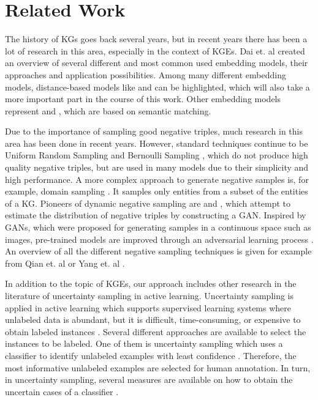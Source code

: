\section{Related Work} 
\label{sec:relatedwork}

The history of \acp{KG} goes back several years, but in recent years there has been a lot of research in this area, especially in the context of \acp{KGE}.  
Dai et. al \cite{electronics9050750} created an overview of several different and most common used embedding models, their approaches and application possibilities.
Among many different embedding models, distance-based models like \transe \cite{TransE} and \transd \cite{TransD} can be highlighted, which will also take a more important part in the course of this work.
Other embedding models represent \distmult \cite{DistMult} and \complex \cite{ComplEx}, which are based on semantic matching. 

Due to the importance of sampling good negative triples, much research in this area has been done in recent years.
However, standard techniques continue to be Uniform Random Sampling \cite{TransE} and Bernoulli Sampling \cite{TransH}, which do not produce high quality negative triples, but are used in many models due to their simplicity and high performance.  
A more complex approach to generate negative samples is, for example, domain sampling \cite{domainSampling}.
It samples only entities from a subset of the entities of a \ac{KG}.
Pioneers of dynamic negative sampling are \kbgan \cite{cai2017kbgan} and \igan \cite{IGAN}, which attempt to estimate the distribution of negative triples by constructing a \ac{GAN}.
Inspired by \acp{GAN}, which were proposed for generating samples in a continuous space such as images, pre-trained models are improved through an adversarial learning process \cite{cai2017kbgan}.
An overview of all the different negative sampling techniques is given for example from Qian et. al \cite{qiannegative} or Yang et. al \cite{MCNS}.

In addition to the topic of \acp{KGE}, our approach includes other research in the literature of uncertainty sampling in active learning.
Uncertainty sampling is applied in active learning which supports supervised learning systems where unlabeled data is abundant, but it is difficult, time-consuming, or expensive to obtain labeled instances \cite{Settles2009ActiveLL}.
Several different approaches are available to select the instances to be labeled.
One of them is uncertainty sampling which uses a classifier to identify unlabeled examples with least confidence \cite{5272205}.
Therefore, the most informative unlabeled examples are selected for human annotation.
In turn, in uncertainty sampling, several measures are available on how to obtain the uncertain cases of a classifier \cite{nguyen2021howtomeasure}.